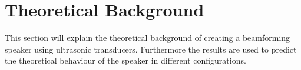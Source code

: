 \chapter{Theoretical Background}
%
This section will explain the theoretical background of creating a beamforming speaker using ultrasonic transducers. Furthermore the results are used to predict the theoretical behaviour of the speaker in different configurations.
%

